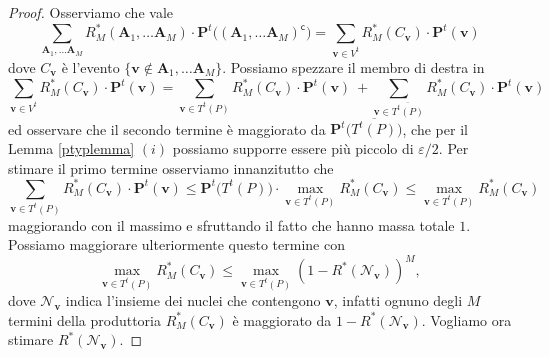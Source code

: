 \begin{proof}
	Osserviamo che vale
	\[\sum_{\mathbf{A}_{1},\dots\mathbf{A}_{M}} R_{M}^{*}(\mathbf{A}_{1},\dots\mathbf{A}_{M})\cdot\mathbf{P}^t\big((\mathbf{A}_{1},\dots\mathbf{A}_{M})^{\mathsf{c}}\big)=\sum_{\mathbf{v}\in V^{t}} R_{M}^{*}(C_{\mathbf{v}})\cdot \mathbf{P}^t(\mathbf{v})\]
	dove \(C_{\mathbf{v}}\) è l'evento \(\{\mathbf{v}\not\in \mathbf{A}_{1},\dots\mathbf{A}_{M}\}\). Possiamo spezzare il membro di destra in 
	\begin{equation}
		\label{eq:objective} \sum_{\mathbf{v}\in V^{t}} R_{M}^{*}(C_{\mathbf{v}})\cdot \mathbf{P}^t(\mathbf{v}) = \sum_{\mathbf{v}\in T^{t}(P)} R_{M}^{*}(C_{\mathbf{v}})\cdot \mathbf{P}^t(\mathbf{v})\ + \sum_{\mathbf{v}\in \overline{T^{t}(P)}} R_{M}^{*}(C_{\mathbf{v}})\cdot \mathbf{P}^t(\mathbf{v}) 
	\end{equation}
	ed osservare che il secondo termine è maggiorato da \(\mathbf{P}^t\Big(\overline{T^{t}(P)}\Big)\), che per il Lemma \ref{ptyplemma} \((i)\) possiamo supporre essere più piccolo di \(\varepsilon/2\). Per stimare il primo termine osserviamo innanzitutto che
	\[\sum_{\mathbf{v}\in T^t(P)} R_M^{*}(C_{\mathbf{v}})\cdot \mathbf{P}^t(\mathbf{v})\le \mathbf{P}^t\big(T^t(P)\big)\cdot \max_{\mathbf{v}\in T^t(P)} R_{M}^{*}(C_{\mathbf{v}})\le \max_{\mathbf{v}\in T^t(P)} R_{M}^{*}(C_{\mathbf{v}})\]
	maggiorando con il massimo e sfruttando il fatto che hanno massa totale \(1\). Possiamo maggiorare ulteriormente questo termine con
	\[\max_{\mathbf{v}\in T^t(P)} R_{M}^{*}(C_{\mathbf{v}})\le \max_{\mathbf{v}\in T^t(P)} (1-R^{*}(\mathcal{N}_{\mathbf{v}}))^{M},\]
	dove \(\mathcal{N}_{\mathbf{v}}\) indica l'insieme dei nuclei che contengono \(\mathbf{v}\), infatti ognuno degli \(M\) termini della produttoria \(R_{M}^{*}(C_{\mathbf{v}})\) è maggiorato da \(1-R^{*}(\mathcal{N}_{\mathbf{v}})\). Vogliamo ora stimare \(R^{*}(\mathcal{N}_{\mathbf{v}})\).
	

\end{proof}
